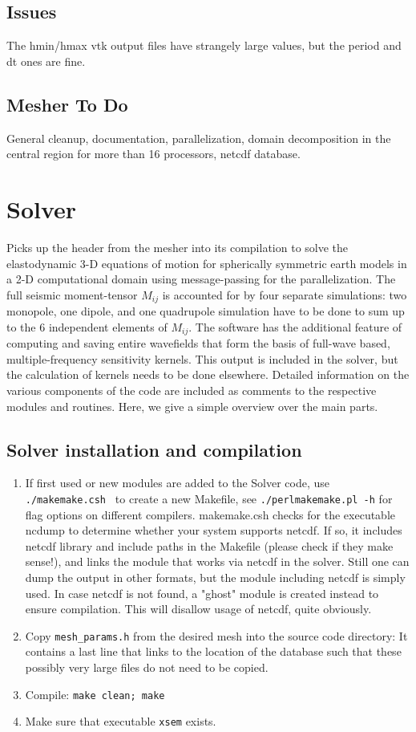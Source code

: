 \documentclass[11pt,letter,fleqn,english,notitlepage]{article}
\begin{document}
\subsection{Issues}
The hmin/hmax vtk output files have strangely large values, but the period and dt ones are fine.

\subsection{Mesher To Do}
General cleanup, documentation, parallelization, domain decomposition in the central region for 
more than 16 processors, netcdf database.

\newpage
\section{Solver}
Picks up the header from the mesher into its compilation to solve 
the elastodynamic 3-D equations of motion for spherically symmetric 
earth models in a 2-D computational domain using message-passing for the 
parallelization. The full seismic moment-tensor $M_{ij}$ is accounted for by four
separate simulations: two monopole, one dipole, and one quadrupole 
simulation have to be done to sum up to the 6 independent elements of $M_{ij}$.
The software has the additional feature of computing and 
saving entire wavefields that form the basis of full-wave based, 
multiple-frequency sensitivity kernels. This output is included in the 
solver, but the calculation of kernels needs to be done elsewhere. 
Detailed information on the various components of the code are included as 
comments to the respective modules and routines. 
Here, we give a simple overview over the main parts. 
\newpage
\subsection{Solver installation and compilation}
\begin{enumerate}
\item If first used or new modules are added to the Solver code,
use {\tt ./makemake.csh } to create a new Makefile, see {\tt ./perlmakemake.pl -h} for 
flag options on different compilers. makemake.csh checks for the
executable ncdump to determine whether your system supports netcdf. If
so, it includes netcdf library and include paths in the Makefile
(please check if they make sense!), and links the module that works
via netcdf in the solver. Still one can dump the output in other
formats, but the module including netcdf is simply used. In case
netcdf is not found, a "ghost" module is created instead to ensure
compilation. This will disallow usage of netcdf, quite obviously.
\item Copy {\tt mesh\_params.h} from the desired mesh into the source code directory: 
It contains a last line that links to the location of the database such that 
these possibly very large files do not need to be copied.
\item Compile: {\tt make clean; make}
\item Make sure that executable {\tt xsem} exists.
\end{enumerate}
\end{document}
